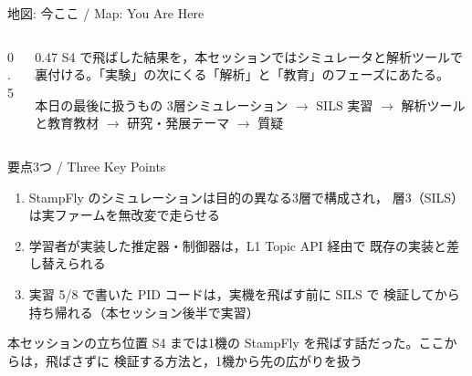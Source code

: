 
\providecommand{\scisessionmap}[1]{}

\begin{frame}{地図: 今ここ / Map: You Are Here}
  \begin{columns}[T]
    \begin{column}{0.5\textwidth}
      \centering
      \resizebox{\columnwidth}{!}{\scisessionmap{5}}
    \end{column}
    \begin{column}{0.47\textwidth}
      \small
      S4 で飛ばした結果を，本セッションではシミュレータと解析ツールで
      裏付ける。「実験」の次にくる「解析」と「教育」のフェーズにあたる。

      \vspace{0.5em}

      \begin{block}{本日の最後に扱うもの}
        \footnotesize
        3層シミュレーション $\to$ SILS 実習 $\to$ 解析ツールと教育教材 $\to$
        研究・発展テーマ $\to$ 質疑
      \end{block}
    \end{column}
  \end{columns}
\end{frame}

\begin{frame}{要点3つ / Three Key Points}
  \begin{enumerate}
    \item StampFly のシミュレーションは目的の異なる3層で構成され，
          層3（SILS）は実ファームを無改変で走らせる
    \item 学習者が実装した推定器・制御器は，L1 Topic API 経由で
          既存の実装と差し替えられる
    \item 実習 5/8 で書いた PID コードは，実機を飛ばす前に SILS で
          検証してから持ち帰れる（本セッション後半で実習）
  \end{enumerate}

  \vspace{0.5em}

  \begin{alertblock}{本セッションの立ち位置}
    \small
    S4 までは1機の StampFly を飛ばす話だった。ここからは，飛ばさずに
    検証する方法と，1機から先の広がりを扱う
  \end{alertblock}
\end{frame}

